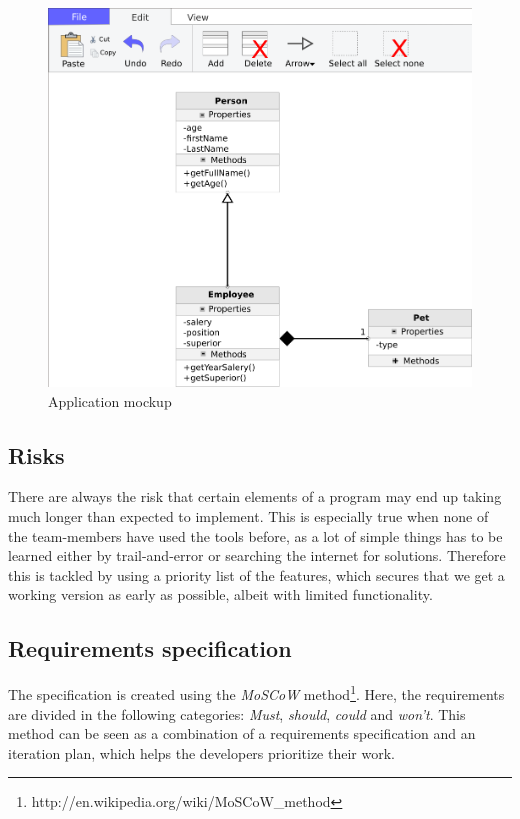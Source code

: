 \begin{figure}[H]
\centering
\includegraphics[width=\linewidth]{img/mockup}
\caption{Application mockup \label{mockup}}
\end{figure}

\subsection{Risks}
There are always the risk that certain elements of a program may end up taking
much longer than expected to implement.
This is especially true when none of the team-members have
used the tools before, as a lot of simple things has to be learned either by
trail-and-error or searching the internet for solutions. Therefore this is
tackled by using a priority list of the features, which secures that we get a
working version as early as possible, albeit with limited functionality. 

\newpage
\subsection{Requirements specification}
The specification is created using the \textit{MoSCoW} 
method\footnote{http://en.wikipedia.org/wiki/MoSCoW\_method}. Here, the 
requirements 
are divided in the following categories: \textit{Must}, \textit{should}, 
\textit{could} and \textit{won't}. This method can be seen as a combination of 
a requirements specification and an iteration plan, which helps the developers 
prioritize their work.

